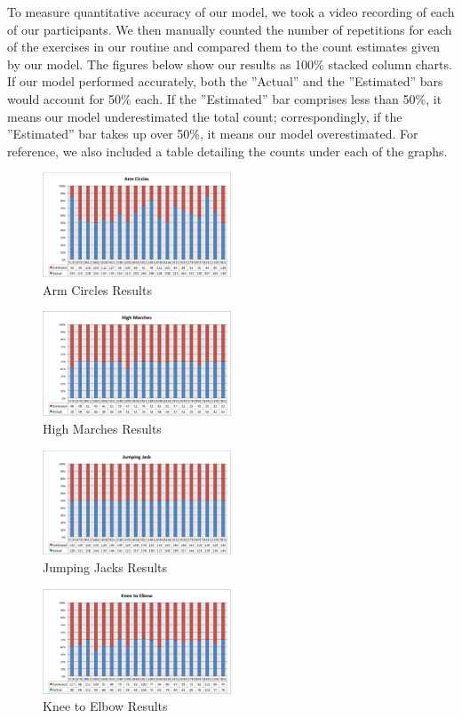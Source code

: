 To measure quantitative accuracy of our model, we took a video recording of each of our participants. We then manually counted the number of repetitions for each of the exercises in our routine and compared them to the count estimates given by our model. The figures below show our results as 100\% stacked column charts. If our model performed accurately, both the ''Actual'' and the ''Estimated'' bars would account for 50\% each. If the ''Estimated'' bar comprises less than 50\%, it means our model underestimated the total count; correspondingly, if the ''Estimated'' bar takes up over 50\%, it means our model overestimated. For reference, we also included a table detailing the counts under each of the graphs.\\
\begin{figure} [htp]
	\includegraphics[width=0.5\textwidth]{images/armcircles}
\caption{Arm Circles Results}
\end{figure}
\begin{figure}[htp]
	\includegraphics[width=0.5\textwidth]{images/highmarches}
\caption{High Marches Results}
\end{figure}
\begin{figure} [htp]
	\includegraphics[width=0.5\textwidth]{images/jumpingjack}
\caption{Jumping Jacks Results}
\end{figure}
\begin{figure} [htp]
	\includegraphics[width=0.5\textwidth]{images/kneetoelbow}
\caption{Knee to Elbow Results}
\end{figure}

